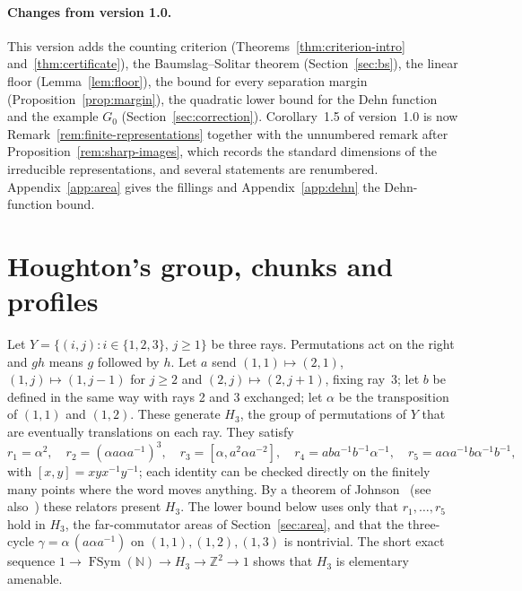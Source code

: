 \documentclass[11pt,a4paper]{article}
\theoremstyle{plain}
\theoremstyle{definition}
\theoremstyle{remark}
\DeclareMathOperator{\FSym}{FSym}
\begin{document}
\paragraph{Changes from version 1.0.} This version adds the counting criterion (Theorems~\ref{thm:criterion-intro} and~\ref{thm:certificate}),
the Baumslag--Solitar theorem (Section~\ref{sec:bs}), the linear floor (Lemma~\ref{lem:floor}), the bound for every separation margin
(Proposition~\ref{prop:margin}), the quadratic lower bound for the Dehn function and the example $G_0$ (Section~\ref{sec:correction}).
Corollary~1.5 of version~1.0 is now Remark~\ref{rem:finite-representations} together with the unnumbered remark after
Proposition~\ref{rem:sharp-images}, which records the standard dimensions of the irreducible representations, and several statements are
renumbered.
Appendix~\ref{app:area} gives the fillings and Appendix~\ref{app:dehn} the Dehn-function bound.

\section{Houghton's group, chunks and profiles}\label{sec:group}

Let $Y=\{(i,j):i\in\{1,2,3\},\,j\ge1\}$ be three rays. Permutations act on the right and
$gh$ means $g$ followed by $h$. Let $a$ send $(1,1)\mapsto(2,1)$, $(1,j)\mapsto(1,j-1)$ for $j\ge2$ and
$(2,j)\mapsto(2,j+1)$, fixing ray~3; let $b$ be defined in the same way with rays 2 and 3 exchanged; let $\alpha$ be
the transposition of $(1,1)$ and $(1,2)$. These generate $H_3$, the group of permutations of $Y$ that are eventually
translations on each ray. They satisfy
\begin{equation}\label{eq:relators}
r_1=\alpha^2,\quad r_2=(\alpha a\alpha a^{-1})^3,\quad r_3=[\alpha,a^2\alpha a^{-2}],\quad
r_4=aba^{-1}b^{-1}\alpha^{-1},\quad r_5=a\alpha a^{-1}b\alpha^{-1}b^{-1},
\end{equation}
with $[x,y]=xyx^{-1}y^{-1}$; each identity can be checked directly on the finitely many points where the word
moves anything. By a theorem of Johnson~\cite{Johnson1999} (see also~\cite[Theorem~2.8]{Lee2012}) these relators present $H_3$. The lower
bound below uses only that $r_1,\dots,r_5$ hold in $H_3$, the far-commutator areas of Section~\ref{sec:area}, and
that the three-cycle $\gamma=\alpha\,(a\alpha a^{-1})$ on $(1,1),(1,2),(1,3)$ is nontrivial. The short exact sequence
$1\to\FSym(\mathbb{N})\to H_3\to\mathbb{Z}^2\to1$ shows that $H_3$ is elementary amenable.
\end{document}
